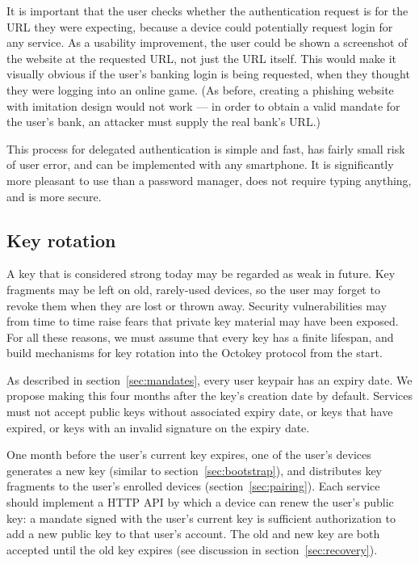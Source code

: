 It is important that the user checks whether the authentication request is for the URL they were
expecting, because a device could potentially request login for any service. As a usability
improvement, the user could be shown a screenshot of the website at the requested URL, not just the
URL itself. This would make it visually obvious if the user's banking login is being requested, when
they thought they were logging into an online game. (As before, creating a phishing website with
imitation design would not work --- in order to obtain a valid mandate for the user's bank, an
attacker must supply the real bank's URL.)

This process for delegated authentication is simple and fast, has fairly small risk of user error,
and can be implemented with any smartphone. It is significantly more pleasant to use than a password
manager, does not require typing anything, and is more secure.

\subsection{Key rotation}\label{sec:rotation}

A key that is considered strong today may be regarded as weak in future. Key fragments may be left
on old, rarely-used devices, so the user may forget to revoke them when they are lost or thrown
away. Security vulnerabilities may from time to time raise fears that private key material may have
been exposed. For all these reasons, we must assume that every key has a finite lifespan, and build
mechanisms for key rotation into the Octokey protocol from the start.

As described in section~\ref{sec:mandates}, every user keypair has an expiry date. We propose making
this four months after the key's creation date by default. Services must not accept public keys
without associated expiry date, or keys that have expired, or keys with an invalid signature on the
expiry date.

One month before the user's current key expires, one of the user's devices generates a new key
(similar to section~\ref{sec:bootstrap}), and distributes key fragments to the user's enrolled
devices (section~\ref{sec:pairing}). Each service should implement a HTTP API by which a device can
renew the user's public key: a mandate signed with the user's current key is sufficient
authorization to add a new public key to that user's account. The old and new key are both accepted
until the old key expires (see discussion in section~\ref{sec:recovery}).

